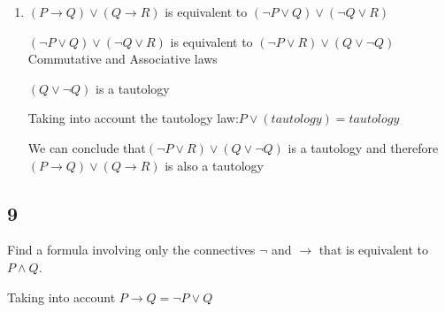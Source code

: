 \documentclass{article}
\begin{document}
\begin{enumerate} [label=(\alph*)]
    which is equivalent to
    
    $(\neg Q \land \neg P)\lor( Q \land R)$ Contradiction law
    
    which is equivalent to
    
    $[(\neg Q \land \neg P)\lor Q]\land[(\neg Q \land \neg P)\lor R]$ Distributive law
    
    which is equivalent to
    
    $[(Q \lor \neg P)\land(Q \lor \neg Q)]\land[(\neg Q \land \neg P)\lor R]$ Distributive law
    
    which is equivalent to
    
    $(Q \lor  \neg P) \land (\neg Q \land \neg P) \lor R$ Contradiction law
    
    which is equivalent to
    
    $Q \lor (\neg P \land \neg P) \land \neg Q \lor R$ Commutative law
    
    which is equivalent to
    
    $(Q \lor \neg P ) \land (\neg Q \lor R)$ Idempotent law
    
    which is equivalent to
    
    $(P \rightarrow Q) \land (Q \rightarrow R)$ Conditional law
    
    Therefore $(P \rightarrow Q) \land (Q \rightarrow R)$ is equivalent to $(P \rightarrow R)\land [(P\leftrightarrow Q)\lor (R \leftrightarrow Q)]$
    \item
    $(P \rightarrow Q) \lor (Q \rightarrow R)$ is equivalent to $(\neg P \lor Q) \lor (\neg Q \lor R)$
    
    $(\neg P \lor Q) \lor (\neg Q \lor R)$ is equivalent to $(\neg P \lor R) \lor( Q \lor \neg Q)$ Commutative and Associative laws
    
    $( Q \lor \neg Q)$ is a tautology
    
    Taking into account the tautology law:$P \lor (tautology)= tautology$ 
    
    We can conclude that$(\neg P \lor R) \lor( Q \lor \neg Q)$ is a tautology and therefore $(P \rightarrow Q) \lor (Q \rightarrow R)$ is also a tautology
\end{enumerate}
\subsection{9}
Find a formula involving only the connectives $\neg$ and $\rightarrow$ that is
equivalent to $P \land Q$.

Taking into account $P \rightarrow Q = \neg P \lor Q$
\end{document}

